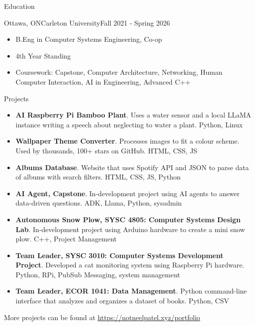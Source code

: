 \documentclass[]{mcdowellcv}
\begin{document}
	\begin{cvsection}{Education}
		\begin{cvsubsection}{Ottawa, ON}{Carleton University}{Fall 2021 - Spring 2026}
			\begin{itemize}
				\item B.Eng in Computer Systems Engineering, Co-op
				\item 4th Year Standing
				\item Coursework: Capstone, Computer Architecture, Networking, Human Computer Interaction, AI in Engineering, Advanced C++ 
			\end{itemize}
		\end{cvsubsection}
	\end{cvsection}
	
	\begin{cvsection}{Projects}
		\begin{cvsubsection}{}{}{}
			\begin{itemize}
				\item \textbf{AI Raspberry Pi Bamboo Plant}. Uses a water sensor and a local LLaMA instance writing a speech about neglecting to water a plant. Python, Linux
				\item \textbf{Wallpaper Theme Converter}. Processes images to fit a colour scheme. Used by thousands, 100+ stars on GitHub. HTML, CSS, JS
				\item \textbf{Albums Database}. Website that uses Spotify API and JSON to parse data of albums with search filters. HTML, CSS, JS, Python
                \item \textbf{AI Agent, Capstone}. In-development project using AI agents to answer data-driven questions. ADK, Llama, Python, sysadmin
				\item \textbf{Autonomous Snow Plow, SYSC 4805: Computer Systems Design Lab}. In-development project using Arduino hardware to create a mini snow plow. C++, Project Management
				\item \textbf{Team Leader, SYSC 3010: Computer Systems Development Project}. Developed a cat monitoring system using Raspberry Pi hardware. Python, RPi, PubSub Messaging, system management
				\item \textbf{Team Leader, ECOR 1041: Data Management}. Python command-line interface that analyzes and organizes a dataset of books. Python, CSV
			\end{itemize}
				More projects can be found at \url{https://notneelpatel.xyz/portfolio}
		\end{cvsubsection}
	\end{cvsection}
	
\end{document}
